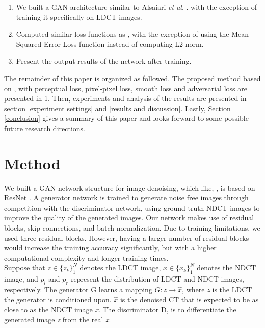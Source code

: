 \documentclass[journal]{IEEEtran}
\begin{document}
	\begin{enumerate}
		\item We built a GAN architecture similar to Alsaiari \emph{et al}. \cite{alsaiari2019image}. with the exception of training it specifically on LDCT images.
		\item Computed similar loss functions as \cite{alsaiari2019image}, with the exception of using the Mean Squared Error Loss function instead of computing L2-norm.
		\item Present the output results of the network after training.\\
	\end{enumerate}
	
 The remainder of this paper is organized as followed.  The proposed method based on \cite{alsaiari2019image}, with perceptual loss, pixel-pixel loss, smooth loss and adversarial loss are presented in \ref{method}.  Then, experiments and analysis of the results are presented in section \ref{experiment settings} and \ref{results and discussion}.  Lastly, Section \ref{conclusion} gives a summary of this paper and looks forward to some possible future research directions.

\section{Method}
\label{method}
	We built a GAN network structure for image denoising, which like, \cite{alsaiari2019image}, is based on ResNet \cite{he2016deep}.  A generator network is trained to generate noise free images through competition with the discriminator network, using ground truth NDCT images to improve the quality of the generated images.  Our network makes use of residual blocks, skip connections, and batch normalization.  Due to training limitations, we used three residual blocks.  However, having a larger number of residual blocks would increase the training accuracy significantly, but with a higher computational complexity and longer training times.\\
	Suppose that $z \in \{z_k\}_1^N$ denotes the LDCT image, $x \in \{x_k\}_1^N$ denotes the NDCT image, and $p_l$ and $p_r$ represent the distribution of LDCT and NDCT images, respectively.  The generator G learns a mapping $G: z \rightarrow \hat{x}$, where \emph{z} is the LDCT the generator is conditioned upon.  $\hat{x}$ is the denoised CT that is expected to be as close to as the NDCT image \emph{x}.  The discriminator D, is to differentiate the generated image \emph{z} from the real \emph{x}.  
	
\end{document}
